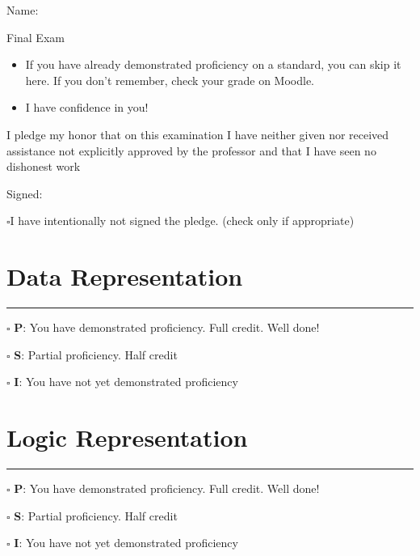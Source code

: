 \documentclass[12pt]{article}
\begin{document}
Name: \makebox[3in]{\hrulefill
\hrulefill}

\vfill

\begin{center}
{\huge Final Exam}
\end{center}

\begin{itemize}
    \item If you have already demonstrated proficiency on a standard, you can skip it here. If you don't remember, check your grade on Moodle.
    \item I have confidence in you!
\end{itemize}

\vfill

I pledge my honor that on this examination I have neither given nor received assistance not explicitly approved by the professor and that I have seen no dishonest work 

\hfill Signed: \makebox[3in]{\hrulefill}

$\square$\quad I have intentionally not signed the pledge. (check only if appropriate)
\newpage


\section*{Data Representation}

\vfill

\rule[1ex]{\textwidth}{.1pt}

$\square$ \textbf{P}: You have demonstrated proficiency. Full credit. Well done!

$\square$ \textbf{S}: Partial proficiency. Half credit

$\square$ \textbf{I}: You have not yet demonstrated proficiency

\newpage


\section*{Logic Representation}

\vfill

\rule[1ex]{\textwidth}{.1pt}

$\square$ \textbf{P}: You have demonstrated proficiency. Full credit. Well done!

$\square$ \textbf{S}: Partial proficiency. Half credit

$\square$ \textbf{I}: You have not yet demonstrated proficiency
\end{document}
